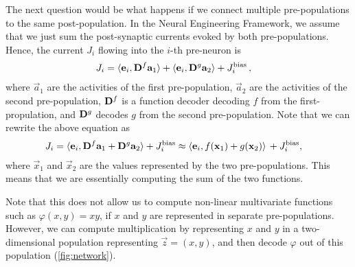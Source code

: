 \documentclass[10pt,letterpaper,oneside]{article}
\begin{document}
	The next question would be what happens if we connect multiple pre-populations to the same post-population. In the Neural Engineering Framework, we assume that we just sum the post-synaptic currents evoked by both pre-populations. Hence, the current $J_i$ flowing into the $i$-th pre-neuron is
	\begin{align*}
		J_i &= \langle {\mathbf{e}}_i, {\mathbf{D}}^f {\mathbf{a}}_1 \rangle + \langle {\mathbf{e}}_i, {\mathbf{D}}^g {\mathbf{a}}_2 \rangle + J^\mathrm{bias}_i \,,
	\end{align*}
	where $\vec a_1$ are the activities of the first pre-population, $\vec a_2$ are the activities of the second pre-population, ${\mathbf{D}}^f$ is a function decoder decoding $f$ from the first-propulation, and ${\mathbf{D}}^g$ decodes $g$ from the second pre-population. Note that we can rewrite the above equation as
	\begin{align*}
		J_i &= \langle {\mathbf{e}}_i, {\mathbf{D}}^f {\mathbf{a}}_1 + {\mathbf{D}}^g {\mathbf{a}}_2 \rangle + J^\mathrm{bias}_i \approx \langle {\mathbf{e}}_i, f({\mathbf{x}}_1) + g({\mathbf{x}}_2) \rangle \, + J^\mathrm{bias}_i,
	\end{align*}
	where $\vec x_1$ and $\vec x_2$ are the values represented by the two pre-populations. This means that we are essentially computing the sum of the two functions.

	Note that this does not allow us to compute non-linear multivariate functions such as $\varphi(x, y) = xy$, if $x$ and $y$ are represented in separate pre-populations. However, we can compute multiplication by representing $x$ and $y$ in a two-dimensional population representing $\vec z = (x, y)$, and then decode $\varphi$ out of this population (\cref{fig:network}).
	\printbibliography
	
\end{document}
